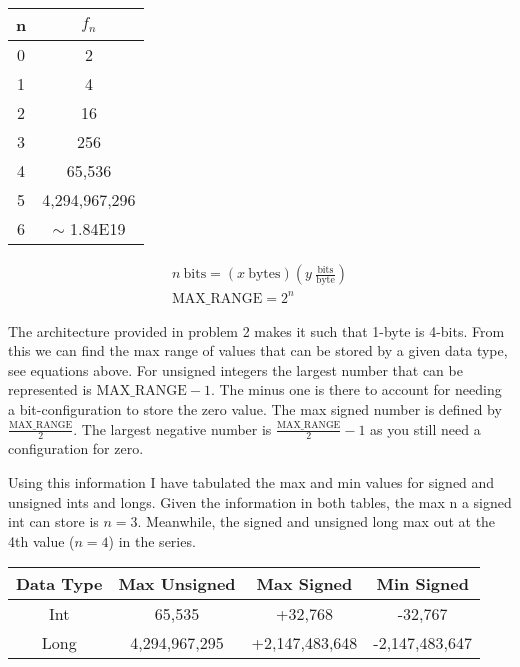 \documentclass[12pt]{exam}
\begin{document}
\begin{enumerate}
        \begin{center}
            \begin{tabular}{ |c|c| }
                \hline
                    n & $f_n$ \\
                \hline
                    0   & 2 \\
                    \rowcolor{Gray}         
                    1   & 4 \\
                    2   & 16 \\
                    \rowcolor{Gray}
                    3   & 256 \\
                    4   & 65,536 \\
                    \rowcolor{Gray}
                    5   & 4,294,967,296 \\
                    6   & $\sim$ 1.84E19\\
                \hline
            \end{tabular}
        \end{center}

        
        \begin{gather*}
            n \: \text{bits} = \left(x \: \text{bytes}\right) \left(y \: \frac{\text{bits}}{\text{byte}}\right) \\
            \text{MAX\_RANGE} = 2^{n}
        \end{gather*}

        
        The architecture provided in problem 2 makes it such that 1-byte is 4-bits. From this we can find the max range of values that can be stored by a given data type, see equations above. For unsigned integers the largest number that can be represented is $\text{MAX\_RANGE} - 1$. The minus one is there to account for needing a bit-configuration to store the zero value. The max signed number is defined by $\frac{\text{MAX\_RANGE}}{2}$. The largest negative number is $\frac{\text{MAX\_RANGE}}{2} - 1$ as you still need a configuration for zero.

        Using this information I have tabulated the max and min values for signed and unsigned ints and longs. Given the information in both tables, the max n a signed int can store is $n=3$. Meanwhile, the signed and unsigned long max out at the 4th value ($n=4$) in the series.

        \begin{center}
            \begin{tabular}{ |c|c|c|c| }
                \hline
                                Data Type & Max Unsigned & Max Signed & Min Signed \\
                \hline
                        Int    &     65,535     & +32,768   & -32,767 \\    
                \hline    
                        Long   & 4,294,967,295  & +2,147,483,648 & -2,147,483,647 \\
                \hline
            \end{tabular}
        \end{center}


\end{enumerate}
\end{document}
